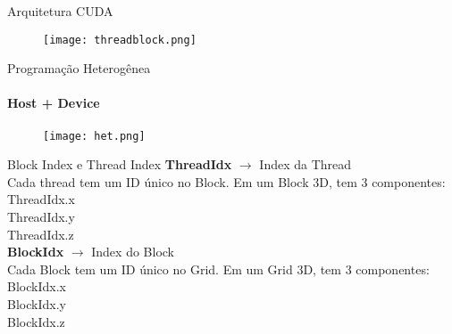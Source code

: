 \begin{frame}[t]{Arquitetura CUDA}
    \begin{figure}
        \texttt{[image: threadblock.png]}
    \end{figure}

\end{frame}
\begin{frame}[t]{Programação Heterogênea}
    \framesubtitle{Host + Device}
    \begin{figure}
        \texttt{[image: het.png]}
    \end{figure}

\end{frame}
\begin{frame}[t]{Block Index e Thread Index}
    \textbf{\Large{ThreadIdx}} $\rightarrow$ Index da Thread\\
    Cada thread tem um ID único no Block. Em um Block 3D, tem 3 componentes:\\
    ThreadIdx.x\\
    ThreadIdx.y\\
    ThreadIdx.z\\
    \vspace*{0.5cm}
    \textbf{\Large{BlockIdx}} $\rightarrow$ Index do Block\\
    Cada Block tem um ID único no Grid. Em um Grid 3D, tem 3 componentes:\\
    BlockIdx.x\\
    BlockIdx.y\\
    BlockIdx.z\\

\end{frame}
